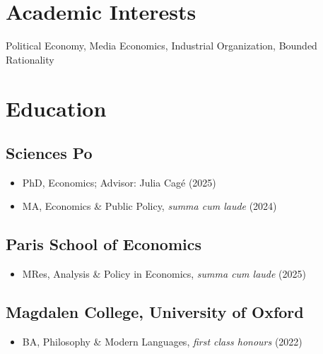\documentclass{cv_style}
\begin{document}


    \begin{center}  

    
	\end{center}
	
	\section{Academic Interests}
	Political Economy, Media Economics, Industrial Organization, Bounded Rationality

	\section{Education}
		\subsection{Sciences Po}
				\begin{itemize}
					\item PhD, Economics; Advisor: Julia Cagé (2025\textendash)
					\item MA, Economics \& Public Policy, \textit{summa cum laude} (2024) %
				\end{itemize}
                
		\subsection{Paris School of Economics}
				\begin{itemize}
					\item MRes, Analysis \& Policy in Economics, \textit{summa cum laude} (2025)
				\end{itemize}
				
		\subsection{Magdalen College, University of Oxford}
				\begin{itemize}
					\item BA, Philosophy \& Modern Languages, \textit{first class honours} (2022)
				\end{itemize}
		
\end{document}
